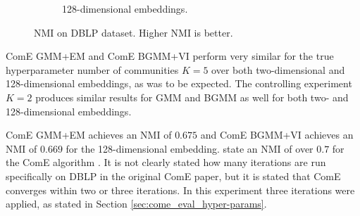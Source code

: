 \documentclass[conference]{IEEEtran}
\begin{document}
\begin{figure}[htbp]
\begin{subfigure}{.5\textwidth}
        \caption{128-dimensional embeddings.}
        \label{fig:dblp_nmi_d128}
    \end{subfigure}

    \caption{NMI on DBLP dataset. Higher NMI is better.}
    \label{fig:dblp_nmi}
\end{figure}

ComE GMM+EM and ComE BGMM+VI perform very similar for the true hyperparameter number of communities $K=5$ over both two-dimensional and 128-dimensional embeddings, as was to be expected. The controlling experiment $K=2$ produces similar results for GMM and BGMM as well for both two- and 128-dimensional embeddings.

ComE GMM+EM achieves an NMI of $0.675$ and ComE BGMM+VI achieves an NMI of $0.669$ for the 128-dimensional embedding.
\citeauthor{ComE} state an NMI of over $0.7$ for the ComE algorithm \cite{ComE}. It is not clearly stated how many iterations are run specifically on DBLP in the original ComE paper, but it is stated that ComE converges within two or three iterations.\cite{ComE} In this experiment three iterations were applied, as stated in Section \ref{sec:come_eval_hyper-params}.
\end{document}
